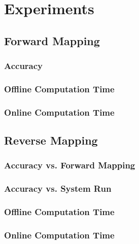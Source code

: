 \section{Experiments}

 \subsection{Forward Mapping}

  \subsubsection{Accuracy}

  \subsubsection{Offline Computation Time}

  \subsubsection{Online Computation Time}

 \subsection{Reverse Mapping}

  \subsubsection{Accuracy vs. Forward Mapping}

  \subsubsection{Accuracy vs. System Run}

  \subsubsection{Offline Computation Time}

  \subsubsection{Online Computation Time}
